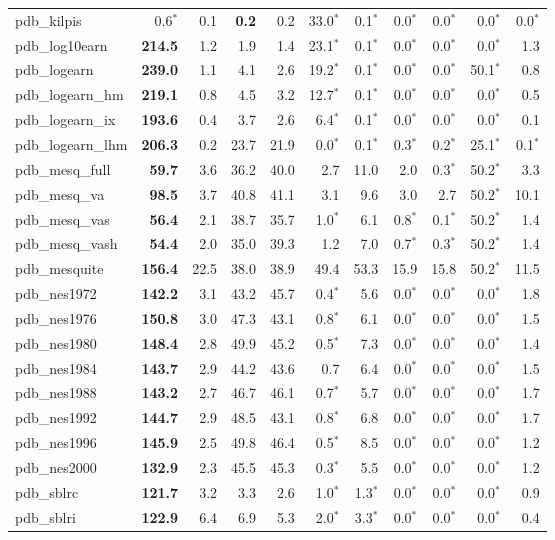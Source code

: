 \begin{tabular}{lrrrrrrrrrr}
pdb\_kilpis & 0.6$^{*}$ & 0.1 & \textbf{0.2} & 0.2 & 33.0$^{*}$ & 0.1$^{*}$ & 0.0$^{*}$ & 0.0$^{*}$ & 0.0$^{*}$ & 0.0$^{*}$ \\
pdb\_log10earn & \textbf{214.5} & 1.2 & 1.9 & 1.4 & 23.1$^{*}$ & 0.1$^{*}$ & 0.0$^{*}$ & 0.0$^{*}$ & 0.0$^{*}$ & 1.3 \\
pdb\_logearn & \textbf{239.0} & 1.1 & 4.1 & 2.6 & 19.2$^{*}$ & 0.1$^{*}$ & 0.0$^{*}$ & 0.0$^{*}$ & 50.1$^{*}$ & 0.8 \\
pdb\_logearn\_hm & \textbf{219.1} & 0.8 & 4.5 & 3.2 & 12.7$^{*}$ & 0.1$^{*}$ & 0.0$^{*}$ & 0.0$^{*}$ & 0.0$^{*}$ & 0.5 \\
pdb\_logearn\_ix & \textbf{193.6} & 0.4 & 3.7 & 2.6 & 6.4$^{*}$ & 0.1$^{*}$ & 0.0$^{*}$ & 0.0$^{*}$ & 0.0$^{*}$ & 0.1 \\
pdb\_logearn\_lhm & \textbf{206.3} & 0.2 & 23.7 & 21.9 & 0.0$^{*}$ & 0.1$^{*}$ & 0.3$^{*}$ & 0.2$^{*}$ & 25.1$^{*}$ & 0.1$^{*}$ \\
pdb\_mesq\_full & \textbf{59.7} & 3.6 & 36.2 & 40.0 & 2.7 & 11.0 & 2.0 & 0.3$^{*}$ & 50.2$^{*}$ & 3.3 \\
pdb\_mesq\_va & \textbf{98.5} & 3.7 & 40.8 & 41.1 & 3.1 & 9.6 & 3.0 & 2.7 & 50.2$^{*}$ & 10.1 \\
pdb\_mesq\_vas & \textbf{56.4} & 2.1 & 38.7 & 35.7 & 1.0$^{*}$ & 6.1 & 0.8$^{*}$ & 0.1$^{*}$ & 50.2$^{*}$ & 1.4 \\
pdb\_mesq\_vash & \textbf{54.4} & 2.0 & 35.0 & 39.3 & 1.2 & 7.0 & 0.7$^{*}$ & 0.3$^{*}$ & 50.2$^{*}$ & 1.4 \\
pdb\_mesquite & \textbf{156.4} & 22.5 & 38.0 & 38.9 & 49.4 & 53.3 & 15.9 & 15.8 & 50.2$^{*}$ & 11.5 \\
pdb\_nes1972 & \textbf{142.2} & 3.1 & 43.2 & 45.7 & 0.4$^{*}$ & 5.6 & 0.0$^{*}$ & 0.0$^{*}$ & 0.0$^{*}$ & 1.8 \\
pdb\_nes1976 & \textbf{150.8} & 3.0 & 47.3 & 43.1 & 0.8$^{*}$ & 6.1 & 0.0$^{*}$ & 0.0$^{*}$ & 0.0$^{*}$ & 1.5 \\
pdb\_nes1980 & \textbf{148.4} & 2.8 & 49.9 & 45.2 & 0.5$^{*}$ & 7.3 & 0.0$^{*}$ & 0.0$^{*}$ & 0.0$^{*}$ & 1.4 \\
pdb\_nes1984 & \textbf{143.7} & 2.9 & 44.2 & 43.6 & 0.7 & 6.4 & 0.0$^{*}$ & 0.0$^{*}$ & 0.0$^{*}$ & 1.5 \\
pdb\_nes1988 & \textbf{143.2} & 2.7 & 46.7 & 46.1 & 0.7$^{*}$ & 5.7 & 0.0$^{*}$ & 0.0$^{*}$ & 0.0$^{*}$ & 1.7 \\
pdb\_nes1992 & \textbf{144.7} & 2.9 & 48.5 & 43.1 & 0.8$^{*}$ & 6.8 & 0.0$^{*}$ & 0.0$^{*}$ & 0.0$^{*}$ & 1.7 \\
pdb\_nes1996 & \textbf{145.9} & 2.5 & 49.8 & 46.4 & 0.5$^{*}$ & 8.5 & 0.0$^{*}$ & 0.0$^{*}$ & 0.0$^{*}$ & 1.2 \\
pdb\_nes2000 & \textbf{132.9} & 2.3 & 45.5 & 45.3 & 0.3$^{*}$ & 5.5 & 0.0$^{*}$ & 0.0$^{*}$ & 0.0$^{*}$ & 1.2 \\
pdb\_sblrc & \textbf{121.7} & 3.2 & 3.3 & 2.6 & 1.0$^{*}$ & 1.3$^{*}$ & 0.0$^{*}$ & 0.0$^{*}$ & 0.0$^{*}$ & 0.9 \\
pdb\_sblri & \textbf{122.9} & 6.4 & 6.9 & 5.3 & 2.0$^{*}$ & 3.3$^{*}$ & 0.0$^{*}$ & 0.0$^{*}$ & 0.0$^{*}$ & 0.4 \\
\bottomrule
\end{tabular}
